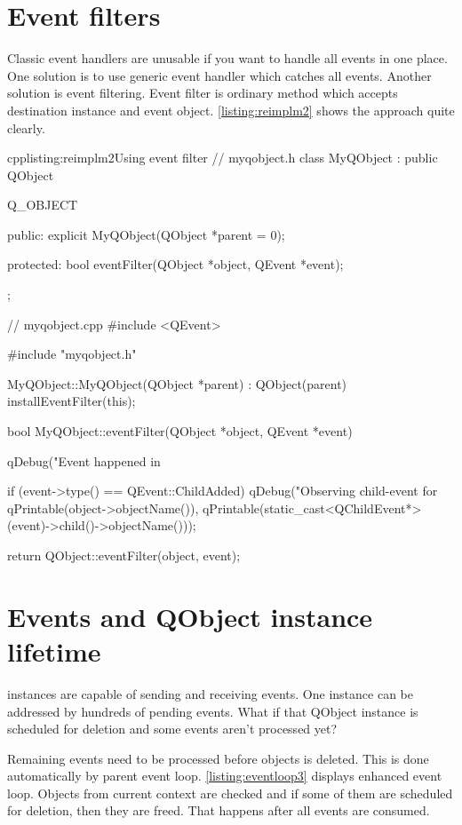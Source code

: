 \section{Event filters}
Classic event handlers are unusable if you want to handle all events in one place. One solution is to use generic event handler which catches all events. Another solution is event filtering. Event filter is ordinary method which accepts destination instance and event object. \autoref{listing:reimplm2} shows the approach quite clearly.

\begin{fdoccode}{cpp}{listing:reimplm2}{Using event filter}
// myqobject.h
class MyQObject : public QObject {
	Q_OBJECT

    public:
		explicit MyQObject(QObject *parent = 0);

    protected:
		bool eventFilter(QObject *object, QEvent *event);
};

// myqobject.cpp
#include <QEvent>

#include "myqobject.h"


MyQObject::MyQObject(QObject *parent) : QObject(parent) {
    installEventFilter(this);
}

bool MyQObject::eventFilter(QObject *object, QEvent *event) {
    qDebug("Event happened in %

    if (event->type() == QEvent::ChildAdded) {
				qDebug("Observing child-event for %
	      qPrintable(object->objectName()),
	      qPrintable(static_cast<QChildEvent*>(event)->child()->objectName()));
    }

    return QObject::eventFilter(object, event);
}
\end{fdoccode}

\section{Events and QObject instance lifetime}
 instances are capable of sending and receiving events. One instance can be addressed by hundreds of pending events. What if that QObject instance is scheduled for deletion and some events aren't processed yet?

Remaining events need to be processed before objects is deleted. This is done automatically by parent event loop. \autoref{listing:eventloop3} displays enhanced event loop. Objects from current context are checked and if some of them are scheduled for deletion, then they are freed. That happens after all events are consumed.

